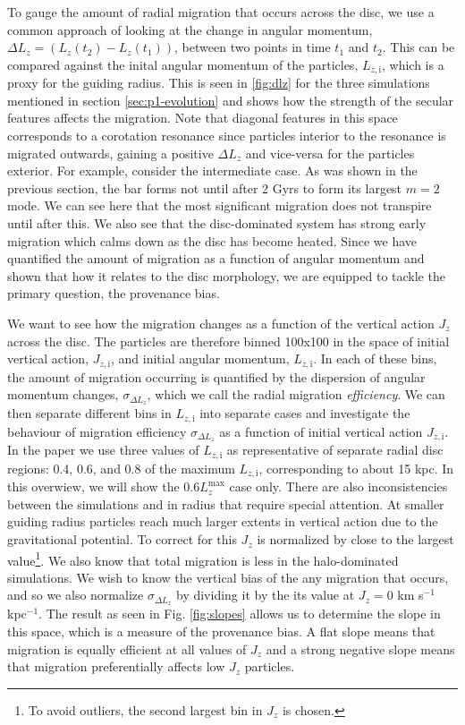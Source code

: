 To gauge the amount of radial migration that occurs across the disc, we use a common approach of looking at the change in angular momentum, $\Delta L_z = (L_z(t_2) - L_z(t_1))$, between two points in time $t_1$ and $t_2$. This can be compared against the inital angular momentum of the particles, $L_{z, \mathrm{i}}$, which is a proxy for the guiding radius. This is seen in \ref{fig:dlz} for the three simulations mentioned in section \ref{sec:p1-evolution} and shows how the strength of the secular features affects the migration. Note that diagonal features in this space corresponds to a corotation resonance since particles interior to the resonance is migrated outwards, gaining a positive $\Delta L_z$ and vice-versa for the particles exterior. For example, consider the intermediate case. As was shown in the previous section, the bar forms not until after 2 Gyrs to form its largest $m=2$ mode. We can see here that the most significant migration does not transpire until after this. We also see that the disc-dominated system has strong early migration which calms down as the disc has become heated. Since we have quantified the amount of migration as a function of angular momentum and shown that how it relates to the disc morphology, we are equipped to tackle the primary question, the provenance bias.

We want to see how the migration changes as a function of the vertical action $J_z$ across the disc. The particles are therefore binned 100x100 in the space of initial vertical action, $J_{z, \mathrm{i}}$, and initial angular momentum, $L_{z, \mathrm{i}}$. In each of these bins, the amount of migration occurring is quantified by the dispersion of angular momentum changes, $\sigma_{\Delta L_z}$, which we call the radial migration \textit{efficiency}. We can then separate different bins in $L_{z, \mathrm{i}}$ into separate cases and investigate the behaviour of migration efficiency $\sigma_{\Delta L_z}$ as a function of initial vertical action $J_{z, \mathrm{i}}$. In the paper we use three values of $L_{z, \mathrm{i}}$ as representative of separate radial disc regions: 0.4, 0.6, and 0.8 of the maximum $L_{z, \mathrm{i}}$, corresponding to about 15 kpc. In this overwiew, we will show the $0.6 L_z^\mathrm{max}$ case only. There are also inconsistencies between the simulations and in radius that require special attention. At smaller guiding radius particles reach much larger extents in vertical action due to the gravitational potential. To correct for this $J_z$ is normalized by close to the largest value\footnote{To avoid outliers, the second largest bin in $J_z$ is chosen.}. We also know that total migration is less in the halo-dominated simulations. We wish to know the vertical bias of the any migration that occurs, and so we also normalize $\sigma_{\Delta L_z}$ by dividing it by the its value at $J_z = 0$ km s$^{-1}$ kpc$^{-1}$. The result as seen in Fig. \ref{fig:slopes} allows us to determine the slope in this space, which is a measure of the provenance bias. A flat slope means that migration is equally efficient at all values of $J_z$ and a strong negative slope means that migration preferentially affects low $J_z$ particles.

